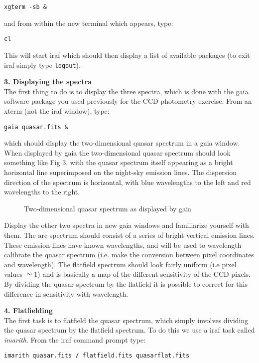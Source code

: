 {\tt \verb,xgterm -sb &,}

\noindent
and from within the new terminal which appears, type:

{\tt cl}

\noindent
This will start {\sc iraf} which should then display a list of available
packages (to exit {\sc iraf} simply type {\tt logout}).

{\large {\bf 3. Displaying the spectra}}\\
The first thing to do is to display the three spectra, which is done
with the {\sc gaia} software package you used previously for the CCD
photometry exercise. From an xterm (not the {\sc iraf} window), type:

{\tt gaia quasar.fits \&}

which should display the two-dimensional quasar spectrum in a {\sc gaia}
window. When displayed by {\sc gaia} the two-dimensional
quasar spectrum should look something like Fig 3, with the quasar spectrum
itself appearing as a bright horizontal line superimposed on the night-sky
emission lines. The dispersion direction of the spectrum is
horizontal, with blue wavelengths to the left and red wavelengths to
the right.
\begin{figure}
\centerline{}
\caption{Two-dimensional quasar spectrum as displayed by {\sc gaia}}
\end{figure}

Display the other two spectra in new {\sc gaia} windows and familiarize yourself with them. The
arc spectrum should consist of a series of bright vertical emission
lines. These emission lines have known wavelengths, and will be used 
to wavelength calibrate the quasar spectrum (i.e. make the conversion 
between pixel coordinates and wavelength). The flatfield spectrum
should look fairly uniform (i.e pixel values $\simeq1$) and is
basically a map of the different sensitivity 
of the CCD pixels. By dividing the quasar spectrum by the flatfield 
it is possible to correct for this difference in sensitivity with wavelength.


{\large {\bf 4. Flatfielding}}\\
The first task is to flatfield the quasar spectrum, which simply involves
dividing the quasar spectrum by the flatfield spectrum. To do this we
use a {\sc iraf} task called {\it imarith}. From the {\sc iraf} command prompt type:

{\tt imarith quasar.fits \verb,/, flatfield.fits quasarflat.fits}

